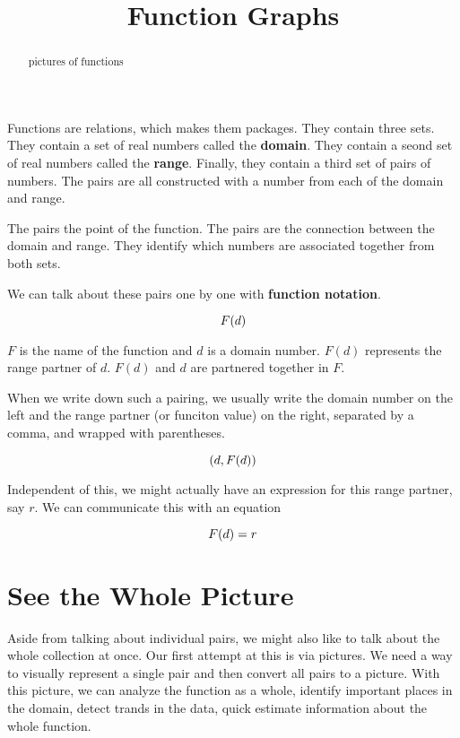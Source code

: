 \documentclass{ximera}
\title{Function Graphs}
\begin{document}
\begin{abstract}
pictures of functions
\end{abstract}
\maketitle


Functions are relations, which makes them packages.  They contain three sets.  They contain a set of real numbers called the \textbf{domain}.  They contain a seond set of real numbers called the \textbf{range}. Finally, they contain a third set of pairs of numbers.  The pairs are all constructed with a number from each of the domain and range.

The pairs the point of the function.  The pairs are the connection between the domain and range.  They identify which numbers are associated together from both sets.

We can talk about these pairs one by one with \textbf{function notation}.

\[
\large{F(d)}
\]


$F$ is the name of the function and $d$ is a domain number.  $F(d)$ represents the range partner of $d$.  $F(d)$ and $d$ are partnered together in $F$.

When we write down such a pairing, we usually write  the domain number on the left and the range partner (or funciton value) on the right, separated by a comma, and wrapped with parentheses.

\[ 
\large{(d, F(d))} 
\]

Independent of this, we might actually have an expression for this range partner, say $r$.  We can communicate this with an equation


\[
\large{F(d)} = r
\]


\section{See the Whole Picture}

Aside from talking about individual pairs, we might also like to talk about the whole collection at once.  Our first attempt at this is via pictures. We need a way to visually represent a single pair and then convert all pairs to a picture.  With this picture, we can analyze the function as a whole, identify important places in the domain, detect trands in the data, quick estimate information about the whole function.
\end{document}
